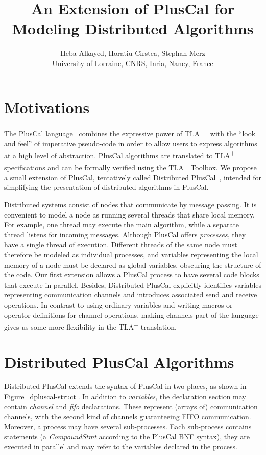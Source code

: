 \documentclass{article}
\title{An Extension of PlusCal for Modeling Distributed Algorithms}
\author{%
  Heba Alkayed, Horatiu Cirstea, Stephan Merz\\
  University of Lorraine, CNRS, Inria, Nancy, France%
}
\date{}
\newcommand{\tlaplus}{TLA\textsuperscript{+}\xspace}
\begin{document}

\maketitle


\section{Motivations}

The PlusCal language~\cite{pcalAlgo,wayne:practical} combines the expressive power of \tlaplus~\cite{tlabook} with the ``look and feel'' of imperative pseudo-code in order to allow users to express algorithms at a high level of abstraction. PlusCal algorithms are translated to \tlaplus specifications and can be formally verified using the \tlaplus Toolbox. We propose a small extension of PlusCal, tentatively called Distributed PlusCal~\cite{dpluscal}, intended for simplifying the presentation of distributed algorithms in PlusCal.

Distributed systems consist of nodes that communicate by message
passing. It is convenient to model a node as running several threads
that share local memory. For example, one thread may execute the main
algorithm, while a separate thread listens for incoming
messages. Although PlusCal offers \emph{processes}, they have a single
thread of execution. Different threads of the same node must therefore
be modeled as individual processes, and variables representing the
local memory of a node must be declared as global variables, obscuring
the structure of the code. Our first extension allows a PlusCal
process to have several code blocks that execute in parallel. Besides,
Distributed PlusCal explicitly identifies variables representing
communication channels and introduces associated send and receive
operations. In contrast to using ordinary variables and writing macros
or operator definitions for channel operations, making channels part
of the language gives us some more flexibility in the \tlaplus
translation. 


\section{Distributed PlusCal Algorithms}

Distributed PlusCal extends the syntax of PlusCal in two places, as shown in Figure~\ref{dpluscal-struct}. In addition to \emph{variables}, the declaration section may contain \emph{channel} and \emph{fifo} declarations. These represent (arrays of) communication channels, with the second kind of channels guaranteeing FIFO communication. Moreover, a process may have several sub-processes. Each sub-process contains statements (a \emph{CompoundStmt} according to the PlusCal BNF syntax), they are executed in parallel and may refer to the variables declared in the process.
\end{document}
